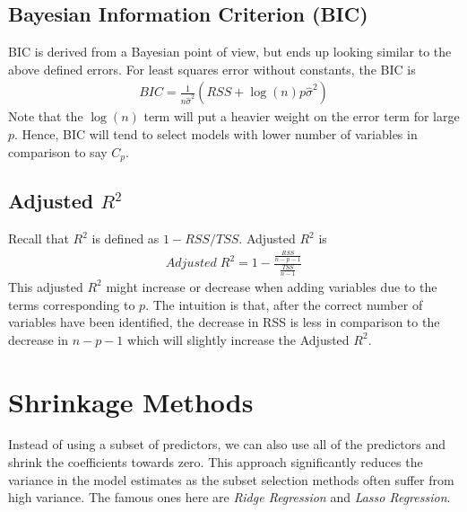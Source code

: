 \documentclass[../statistical_learning_notes.tex]{subfiles}
\begin{document}
    \subsection{Bayesian Information Criterion (BIC)}
    BIC is derived from a Bayesian point of view, but ends up looking similar to the above defined errors.\newline
    For least squares error without constants, the BIC is
    \begin{align*}
        BIC = \frac{1}{n\hat{\sigma}^{2}} (RSS + \log(n)p\hat{\sigma}^{2})
    \end{align*}
    Note that the $\log(n)$ term will put a heavier weight on the error term for large $p$. Hence, BIC will tend to select models with lower number of variables in comparison to say $C_{p}$.

    
    \subsection{Adjusted $R^{2}$}
    Recall that $R^{2}$ is defined as $1 - RSS/TSS$. Adjusted $R^{2}$ is
    \begin{align*}
        Adjusted\;R^{2} = 1 - \frac{\frac{RSS}{n-p-1}}{\frac{TSS}{n-1}}
    \end{align*}
    This adjusted $R^{2}$ might increase or decrease when adding variables due to the terms corresponding to $p$. The intuition is that, after the correct number of variables have been identified, the decrease in RSS is less in comparison to the decrease in $n-p-1$ which will slightly increase the Adjusted $R^{2}$.


    \section{Shrinkage Methods}
    Instead of using a subset of predictors, we can also use all of the predictors and shrink the coefficients towards zero. This approach significantly reduces the variance in the model estimates as the subset selection methods often suffer from high variance. The famous ones here are \emph{Ridge Regression} and \emph{Lasso Regression}.

    
\end{document}
